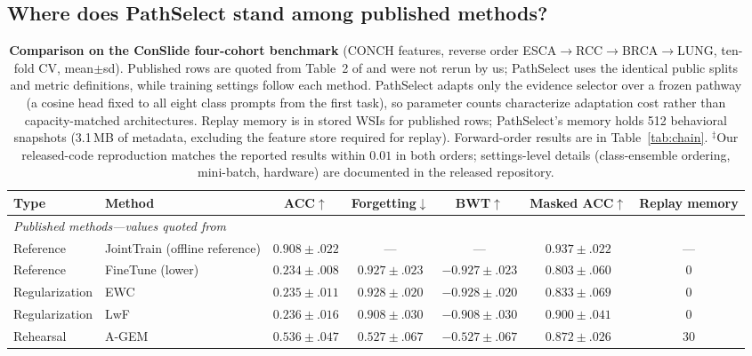 \documentclass{article}
\begin{document}
\subsection{Where does PathSelect stand among published methods?}
\label{ssec:sota}

\begin{table}[!t]
\centering\footnotesize
\caption{\textbf{Comparison on the ConSlide four-cohort benchmark} \cite{huang2023conslide} (CONCH features, reverse order ESCA$\rightarrow$RCC$\rightarrow$BRCA$\rightarrow$LUNG, ten-fold CV, mean$\pm$sd). Published rows are quoted from Table~2 of \cite{gou2025qpmil} and were not rerun by us; PathSelect uses the identical public splits and metric definitions, while training settings follow each method. PathSelect adapts only the evidence selector over a frozen pathway (a cosine head fixed to all eight class prompts from the first task), so parameter counts characterize adaptation cost rather than capacity-matched architectures. Replay memory is in stored WSIs for published rows; PathSelect's memory holds 512 behavioral snapshots (3.1\,MB of metadata, excluding the feature store required for replay). Forward-order results are in Table~\ref{tab:chain}. $^\ddagger$Our released-code reproduction matches the reported results within $0.01$ in both orders; settings-level details (class-ensemble ordering, mini-batch, hardware) are documented in the released repository.}
\label{tab:sota}
\begin{tabular}{llccccc}
\toprule
Type & Method & ACC$\uparrow$ & Forgetting$\downarrow$ & BWT$\uparrow$ & Masked ACC$\uparrow$ & Replay memory \\
\midrule
\multicolumn{7}{l}{\emph{Published methods---values quoted from \cite{gou2025qpmil}}} \\
Reference & JointTrain (offline reference) & $0.908{\pm}.022$ & --- & --- & $0.937{\pm}.022$ & --- \\
Reference & FineTune (lower) & $0.234{\pm}.008$ & $0.927{\pm}.023$ & $-0.927{\pm}.023$ & $0.803{\pm}.060$ & 0 \\
Regularization & EWC \cite{kirkpatrick2017ewc} & $0.235{\pm}.011$ & $0.928{\pm}.020$ & $-0.928{\pm}.020$ & $0.833{\pm}.069$ & 0 \\
Regularization & LwF \cite{li2017lwf} & $0.236{\pm}.016$ & $0.908{\pm}.030$ & $-0.908{\pm}.030$ & $0.900{\pm}.041$ & 0 \\
Rehearsal & A-GEM \cite{chaudhry2019agem} & $0.536{\pm}.047$ & $0.527{\pm}.067$ & $-0.527{\pm}.067$ & $0.872{\pm}.026$ & 30 \\

\end{tabular}
\end{table}
\end{document}
